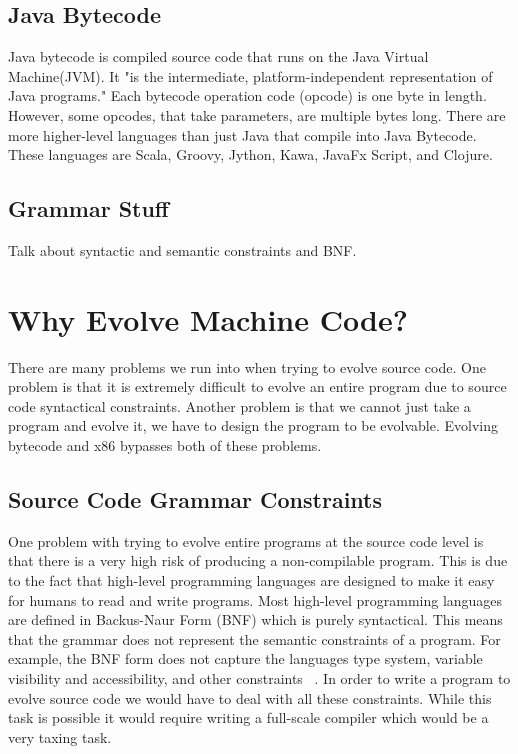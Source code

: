 \documentclass{sig-alternate}
\begin{document}
\subsection{Java Bytecode}
Java bytecode is compiled source code that runs on the Java Virtual Machine(JVM). It "is the intermediate, platform-independent representation of Java programs\cite{VIII:2011}." Each bytecode operation code (opcode) is one byte in length. However, some opcodes, that take parameters, are multiple bytes long\cite{JavaBytecode:2014}.
There are more higher-level languages than just Java that compile into Java Bytecode. These languages are Scala, Groovy, Jython, Kawa, JavaFx Script, and Clojure\cite{FINCH:2011}.


\subsection{Grammar Stuff}
Talk about syntactic and semantic constraints and BNF.


\section{Why Evolve Machine Code?}

There are many problems we run into when trying to evolve source code. One problem is that it is extremely difficult to evolve an entire program due to source code syntactical constraints. Another problem is that we cannot just take a program and evolve it, we have to design the program to be evolvable. Evolving bytecode and x86 bypasses both of these problems.


\subsection{Source Code Grammar Constraints}
One problem with trying to evolve entire programs at the source code level is that there is a very high risk of producing a non-compilable program. This is due to the fact that high-level programming languages are designed to make it easy for humans to read and write programs. Most high-level programming languages are defined in Backus-Naur Form (BNF) which is purely syntactical\cite{BNF:2014}\cite{FINCH:2011}. This means that the grammar does not represent the semantic constraints of a program. For example, the BNF form does not capture the languages type system, variable visibility and accessibility, and other constraints ~\cite{FINCH:2011}. In order to write a program to evolve source code we would have to deal with all these constraints. While this task is possible it would require writing a full-scale compiler which would be a very taxing task. \par
\end{document}
